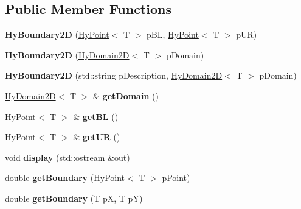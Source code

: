 \subsection*{Public Member Functions}
\begin{DoxyCompactItemize}
\item 
\hypertarget{classHyBoundary2D_a6634b30bd8ed4830fbccd32e775809e0}{
{\bfseries HyBoundary2D} (\hyperlink{classHyPoint}{HyPoint}$<$ T $>$ pBL, \hyperlink{classHyPoint}{HyPoint}$<$ T $>$ pUR)}
\label{classHyBoundary2D_a6634b30bd8ed4830fbccd32e775809e0}

\item 
\hypertarget{classHyBoundary2D_afaa5afd799035a93b81db1f3827d4dcd}{
{\bfseries HyBoundary2D} (\hyperlink{classHyDomain2D}{HyDomain2D}$<$ T $>$ pDomain)}
\label{classHyBoundary2D_afaa5afd799035a93b81db1f3827d4dcd}

\item 
\hypertarget{classHyBoundary2D_aa7f1df578f14fe418bd62de6d6da93a8}{
{\bfseries HyBoundary2D} (std::string pDescription, \hyperlink{classHyDomain2D}{HyDomain2D}$<$ T $>$ pDomain)}
\label{classHyBoundary2D_aa7f1df578f14fe418bd62de6d6da93a8}

\item 
\hypertarget{classHyBoundary2D_a2426ceb9cf51010e45b70325f0a25979}{
\hyperlink{classHyDomain2D}{HyDomain2D}$<$ T $>$ \& {\bfseries getDomain} ()}
\label{classHyBoundary2D_a2426ceb9cf51010e45b70325f0a25979}

\item 
\hypertarget{classHyBoundary2D_a05b010b74e87439ba40be0e50444b086}{
\hyperlink{classHyPoint}{HyPoint}$<$ T $>$ \& {\bfseries getBL} ()}
\label{classHyBoundary2D_a05b010b74e87439ba40be0e50444b086}

\item 
\hypertarget{classHyBoundary2D_a1bd2f62ee2ff0b0aba5e076774d74b14}{
\hyperlink{classHyPoint}{HyPoint}$<$ T $>$ \& {\bfseries getUR} ()}
\label{classHyBoundary2D_a1bd2f62ee2ff0b0aba5e076774d74b14}

\item 
\hypertarget{classHyBoundary2D_a027cba174a0c8edf7246517e1903c3b2}{
void {\bfseries display} (std::ostream \&out)}
\label{classHyBoundary2D_a027cba174a0c8edf7246517e1903c3b2}

\item 
\hypertarget{classHyBoundary2D_a3dfb469e3e776b491992d2e28791191b}{
double {\bfseries getBoundary} (\hyperlink{classHyPoint}{HyPoint}$<$ T $>$ pPoint)}
\label{classHyBoundary2D_a3dfb469e3e776b491992d2e28791191b}

\item 
\hypertarget{classHyBoundary2D_a3715b07c1fbcad1686731e3854a6a0f5}{
double {\bfseries getBoundary} (T pX, T pY)}
\label{classHyBoundary2D_a3715b07c1fbcad1686731e3854a6a0f5}

\end{DoxyCompactItemize}
